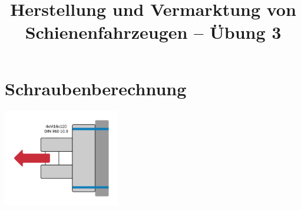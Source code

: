 \documentclass[10pt,a4paper,headsepline,smallheadings]{scrartcl}
\title{Herstellung und Vermarktung von Schienenfahrzeugen  -- \"Ubung 3}
\date{}
\theoremstyle{definition}
\begin{document}
\thispagestyle{empty}
\maketitle
\vspace{-2cm}

\section*{Schraubenberechnung}

\begin{center}
            		\includegraphics[width=0.38\textwidth]{KonsoleKupplung}
		
        		\end{center}
\end{document}
